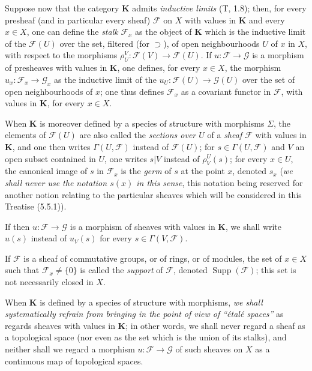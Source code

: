 \begin{env}[3.1.6]
\label{0.3.1.6}
Suppose now that the category $\boldsymbol{K}$ admits \emph{inductive
limits} (T, 1.8); then, for every presheaf (and in particular every
sheaf) $\mathcal{F}$ on $X$ with values in $\boldsymbol{K}$ and every $x\in X$,
one can define the \emph{stalk} $\mathcal{F}_x$ as the object of $\boldsymbol{K}$
which is the inductive limit of the $\mathcal{F}(U)$ over the set, filtered (for
$\supset$), of open neighbourhoods $U$ of $x$ in $X$, with respect to the morphisms
$\rho_U^V:\mathcal{F}(V)\to\mathcal{F}(U)$. If
$u:\mathcal{F}\to\mathcal{G}$ is a morphism of presheaves with values in
$\boldsymbol{K}$, one defines, for every $x\in X$, the morphism
$u_x:\mathcal{F}_x\to\mathcal{G}_x$ as the inductive limit of the
$u_U:\mathcal{F}(U)\to\mathcal{G}(U)$ over the set of open neighbourhoods
of $x$; one thus defines $\mathcal{F}_x$ as a covariant functor in
$\mathcal{F}$, with values in $\boldsymbol{K}$, for every $x\in X$.

When $\boldsymbol{K}$ is moreover defined by a species of structure with
morphisms $\Sigma$, the elements of $\mathcal{F}(U)$ are also called the
\emph{sections over $U$} of a \emph{sheaf $\mathcal{F}$} with values in
$\boldsymbol{K}$, and one then writes $\Gamma(U,\mathcal{F})$ instead of
$\mathcal{F}(U)$; for $s\in\Gamma(U,\mathcal{F})$ and $V$ an open subset contained in
$U$, one writes $s|V$ instead of $\rho_V^U(s)$; for every $x\in U$, the
canonical image of $s$ in $\mathcal{F}_x$ is the \emph{germ} of $s$ at the point $x$,
denoted $s_x$ (\emph{we shall never use the notation $s(x)$ in this sense},
this notation being reserved for another notion relating to the
particular sheaves which will be considered in this Treatise (5.5.1)).

If then $u:\mathcal{F}\to\mathcal{G}$ is a morphism of sheaves with values
in $\boldsymbol{K}$, we shall write $u(s)$ instead of $u_V(s)$ for every
$s\in\Gamma(V,\mathcal{F})$.

If $\mathcal{F}$ is a sheaf of commutative groups, or of rings, or of
modules, the set of $x\in X$ such that
$\mathcal{F}_x\neq\{0\}$ is called the \emph{support} of $\mathcal{F}$, denoted
$\operatorname{Supp}(\mathcal{F})$; this set is not necessarily
closed in $X$.

When $\boldsymbol{K}$ is defined by a species of structure with morphisms,
\emph{we shall systematically refrain from bringing in the point of
view of ``étalé spaces''} as regards sheaves with values in
$\boldsymbol{K}$; in other words, we shall never regard a sheaf as
a topological space (nor even as the set which is the union of its stalks), and
neither shall we regard a morphism
$u:\mathcal{F}\to\mathcal{G}$ of such sheaves on $X$ as a continuous
map of topological spaces.
\end{env}

